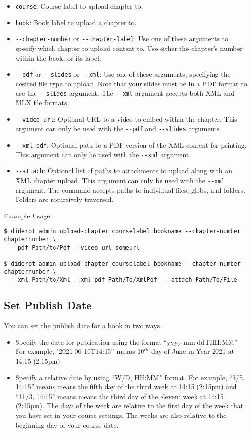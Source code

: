 \begin{itemize}
  \item \verb|course|: Course label to upload chapter to.
  \item \verb|book|: Book label to upload a chapter to.

  \item \verb|--chapter-number| or \verb|--chapter-label|: Use one of these arguments to specify which chapter to upload content to. Use either the chapter's number within the book, or its label.

  \item \verb|--pdf| or \verb|--slides| or \verb|--xml|: Use one of these arguments, specifying the desired file type to upload. Note that your slides must be in a PDF format to use the \verb|--slides| argument. The \verb|--xml| argument accepts both XML and MLX file formats.

  \item \verb|--video-url|: Optional URL to a video to embed within the chapter. This argument can only be used with the \verb|--pdf| and \verb|--slides| arguments.

  \item \verb|--xml-pdf|: Optional path to a PDF version of the XML content for printing. This argument can only be used with the \verb|--xml| argument.

  \item \verb|--attach|: Optional list of paths to attachments to upload along with an XML chapter upload. This argument can only be used with the \verb|--xml| argument. The command accepts paths to individual files, globs, and folders. Folders are recursively traversed.
\end{itemize}

Example Usage:
\begin{verbatim}
$ diderot admin upload-chapter courselabel bookname --chapter-number chapternumber \
  --pdf Path/to/Pdf --video-url someurl

$ diderot admin upload-chapter courselabel bookname --chapter-number chapternumber \
  --xml Path/to/Xml --xml-pdf Path/To/XmlPdf  --attach Path/To/File
\end{verbatim}

\subsection{Set Publish Date}
You can set the publish date for a book in two ways.
\begin{itemize}
\item Specify the date for publication using the format
  ``yyyy-mm-ddTHH:MM'' For example, "2021-06-10T14:15'' means
  10$^{th}$ day of June in Year 2021 at 14:15 (2:15pm)
\item Specify a relative date by using ``W/D, HH:MM'' format.  For
  example, ``3/5, 14:15'' means means the fifth day of the third week
  at 14:15 (2:15pm) and ``11/3, 14:15'' means means the third day of
  the elevent week at 14:15 (2:15pm).  The days of the week are
  relative to the first day of the week that you have set in your
  course settings.  The weeks are also relative to the beginning day
  of your course date.
\end{itemize}

